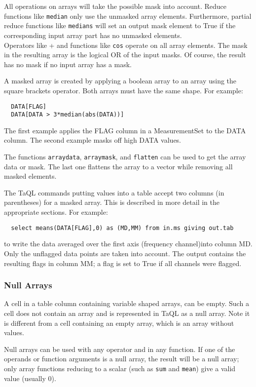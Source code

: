 All operations on arrays will take the possible mask into account.
Reduce functions like \texttt{median} only use
the unmasked array elements. Furthermore, partial reduce functions
like \texttt{medians} will set an output mask element to True if the
corresponding input array part has no unmasked elements.
\\Operators like + and functions like \texttt{cos} operate on all array
elements. The mask in the resulting array is the logical OR of the
input masks. Of course, the result has no mask if no input array has
a mask.

A masked array is created by applying a boolean array to an array
using the square brackets operator. Both arrays must have the same
shape. For example:
\begin{verbatim}
  DATA[FLAG]
  DATA[DATA > 3*median(abs(DATA))]
\end{verbatim}
The first example applies the FLAG column in a MeasurementSet to the
DATA column.
The second example masks off high DATA values.

The functions \texttt{arraydata}, \texttt{arraymask}, and \texttt{flatten}
can be used to get the array data or mask. The last one flattens the
array to a vector while removing all masked elements.

The TaQL commands putting values into a table accept two columns (in
parentheses) for a masked array. This is described in more detail in
the appropriate sections. For example:
\begin{verbatim}
  select means(DATA[FLAG],0) as (MD,MM) from in.ms giving out.tab
\end{verbatim}
to write the data averaged over the first axis (frequency channel)into
column MD. Only the
unflagged data points are taken into account. The output contains
the resulting flags in column MM; a flag is set to True if all channels were flagged.

\subsubsection{Null Arrays}
A cell in a table column containing variable shaped arrays, can be
empty. Such a cell does not contain an array and is represented in
TaQL as a null array.
Note it is different from a cell containing an empty array, which is
an array without values.

Null arrays can be used with any operator and in any function.
If one of the operands or function arguments is a null array, the
result will be a null array; only array functions reducing 
to a scalar (such as {\tt sum} and {\tt mean}) give a valid value (usually 0).

